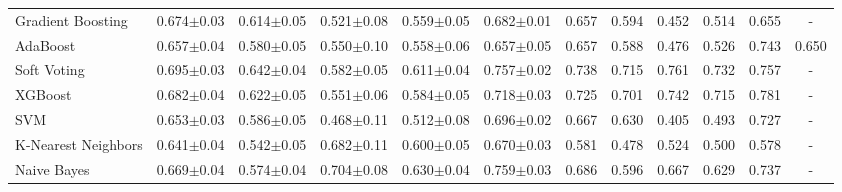 \documentclass[a4paper,12pt]{article}
\begin{document}
\begin{landscape}
{\begin{longtable}{l *{5}{c} *{5}{c} c}
      Gradient Boosting   & 0.674$\pm$0.03                              & 0.614$\pm$0.05                        & 0.521$\pm$0.08 & 0.559$\pm$0.05 & 0.682$\pm$0.01 & 0.657 & 0.594 & 0.452 & 0.514 & 0.655 & -     \\
      AdaBoost            & 0.657$\pm$0.04                              & 0.580$\pm$0.05                        & 0.550$\pm$0.10 & 0.558$\pm$0.06 & 0.657$\pm$0.05 & 0.657 & 0.588 & 0.476 & 0.526 & 0.743 & 0.650 \\
      Soft Voting         & 0.695$\pm$0.03                              & 0.642$\pm$0.04                        & 0.582$\pm$0.05 & 0.611$\pm$0.04 & 0.757$\pm$0.02 & 0.738 & 0.715 & 0.761 & 0.732 & 0.757 & -     \\
      XGBoost             & 0.682$\pm$0.04                              & 0.622$\pm$0.05                        & 0.551$\pm$0.06 & 0.584$\pm$0.05 & 0.718$\pm$0.03 & 0.725 & 0.701 & 0.742 & 0.715 & 0.781 & -     \\
      SVM                 & 0.653$\pm$0.03                              & 0.586$\pm$0.05                        & 0.468$\pm$0.11 & 0.512$\pm$0.08 & 0.696$\pm$0.02 & 0.667 & 0.630 & 0.405 & 0.493 & 0.727 & -     \\
      K-Nearest Neighbors & 0.641$\pm$0.04                              & 0.542$\pm$0.05                        & 0.682$\pm$0.11 & 0.600$\pm$0.05 & 0.670$\pm$0.03 & 0.581 & 0.478 & 0.524 & 0.500 & 0.578 & -     \\
      Naive Bayes         & 0.669$\pm$0.04                              & 0.574$\pm$0.04                        & 0.704$\pm$0.08 & 0.630$\pm$0.04 & 0.759$\pm$0.03 & 0.686 & 0.596 & 0.667 & 0.629 & 0.737 & -     \\
      \bottomrule
    \end{longtable}

}
\end{landscape}
\end{document}
